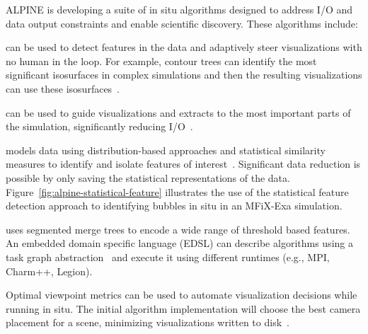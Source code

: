 
ALPINE is developing a suite of in situ  algorithms designed to address I/O and data output constraints and enable scientific discovery.   These algorithms include:
\begin{description}  
	\setlength{\itemsep}{1pt}
    \setlength{\parskip}{0pt}
    \setlength{\parsep}{0pt}
	\item [Topological analysis] can be used to detect features in the data and adaptively steer visualizations with no human in the loop.  For example, contour trees can identify the most significant isosurfaces in complex simulations and then the resulting visualizations can use these isosurfaces~\cite{alpine:Carr:TVCG19}.
	\item [Adaptive sampling]  can be used to guide visualizations and extracts to the most important parts of the simulation, significantly reducing I/O~\cite{alpine:Biswas:ISAV18,alpine:Dutta:Entropy19,alpine:Liu:SC19poster}.  %
	\item [Statistical feature detection] models data using distribution-based approaches and statistical similarity measures to identify and isolate features of interest~\cite{alpine:Dutta:PVIS17,alpine:Dutta:VIS15}. Significant data reduction is possible by only saving the statistical representations of the data.  Figure~\ref{fig:alpine-statistical-feature} illustrates the use of the statistical feature detection approach to identifying bubbles in situ in an MFiX-Exa simulation.  
	\item [Task-based feature extraction] uses segmented merge trees to encode a wide range of threshold based features.  An embedded domain specific language (EDSL) can describe algorithms using a  task graph abstraction~\cite{alpine:Landge:SC14,alpine:Petruzza:IPDPS18} and execute it using different runtimes (e.g., MPI, Charm++, Legion).
	\item [Optimal Viewpoint] Optimal viewpoint metrics can be used to automate visualization decisions while running in situ.  The initial algorithm implementation will choose the best camera placement for a scene, minimizing visualizations written to disk~\cite{alpine:Bonaventura:Entropy18,alpine:Marsaglia:UOtech20}.  

\end{description}
